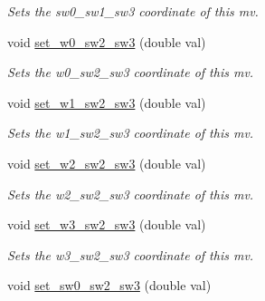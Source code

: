 \begin{DoxyCompactItemize}
\begin{DoxyCompactList}\small\item\em Sets the sw0\-\_\-sw1\-\_\-sw3 coordinate of this mv. \end{DoxyCompactList}\item 
\hypertarget{classe3ga_1_1mv_a28e94741f26ebd2710678ca3b1cf475b}{void \hyperlink{classe3ga_1_1mv_a28e94741f26ebd2710678ca3b1cf475b}{set\-\_\-w0\-\_\-sw2\-\_\-sw3} (double val)}\label{classe3ga_1_1mv_a28e94741f26ebd2710678ca3b1cf475b}

\begin{DoxyCompactList}\small\item\em Sets the w0\-\_\-sw2\-\_\-sw3 coordinate of this mv. \end{DoxyCompactList}\item 
\hypertarget{classe3ga_1_1mv_a69b01a701f57d6b9ee6aef301b2e696a}{void \hyperlink{classe3ga_1_1mv_a69b01a701f57d6b9ee6aef301b2e696a}{set\-\_\-w1\-\_\-sw2\-\_\-sw3} (double val)}\label{classe3ga_1_1mv_a69b01a701f57d6b9ee6aef301b2e696a}

\begin{DoxyCompactList}\small\item\em Sets the w1\-\_\-sw2\-\_\-sw3 coordinate of this mv. \end{DoxyCompactList}\item 
\hypertarget{classe3ga_1_1mv_a2e59c9b0f14489aa421320031ff261ac}{void \hyperlink{classe3ga_1_1mv_a2e59c9b0f14489aa421320031ff261ac}{set\-\_\-w2\-\_\-sw2\-\_\-sw3} (double val)}\label{classe3ga_1_1mv_a2e59c9b0f14489aa421320031ff261ac}

\begin{DoxyCompactList}\small\item\em Sets the w2\-\_\-sw2\-\_\-sw3 coordinate of this mv. \end{DoxyCompactList}\item 
\hypertarget{classe3ga_1_1mv_abd7a24978b65a669ef421b6baf6dd036}{void \hyperlink{classe3ga_1_1mv_abd7a24978b65a669ef421b6baf6dd036}{set\-\_\-w3\-\_\-sw2\-\_\-sw3} (double val)}\label{classe3ga_1_1mv_abd7a24978b65a669ef421b6baf6dd036}

\begin{DoxyCompactList}\small\item\em Sets the w3\-\_\-sw2\-\_\-sw3 coordinate of this mv. \end{DoxyCompactList}\item 
\hypertarget{classe3ga_1_1mv_a61dcb7de1fc75a3f3f81187ae6fb503d}{void \hyperlink{classe3ga_1_1mv_a61dcb7de1fc75a3f3f81187ae6fb503d}{set\-\_\-sw0\-\_\-sw2\-\_\-sw3} (double val)}\label{classe3ga_1_1mv_a61dcb7de1fc75a3f3f81187ae6fb503d}


\end{DoxyCompactItemize}
